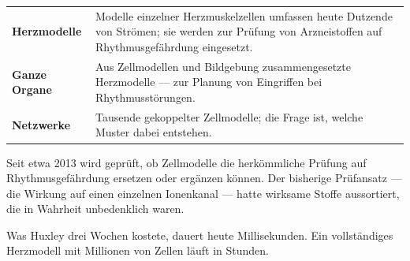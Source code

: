 \begin{forschung}
\begin{center}
{\small
\renewcommand{\arraystretch}{1.45}
\begin{tabular}{@{}P{2.8cm}P{5.4cm}@{}}
\toprule
\textbf{Herzmodelle} & Modelle einzelner Herzmuskelzellen umfassen heute Dutzende von Strömen; sie werden zur Prüfung von Arzneistoffen auf Rhythmusgefährdung eingesetzt.\\
\textbf{Ganze Organe} & Aus Zellmodellen und Bildgebung zusammengesetzte Herzmodelle --- zur Planung von Eingriffen bei Rhythmusstörungen.\\
\textbf{Netzwerke} & Tausende gekoppelter Zellmodelle; die Frage ist, welche Muster dabei entstehen.\\
\bottomrule
\end{tabular}}
\end{center}

Seit etwa 2013 wird geprüft, ob Zellmodelle die herkömmliche Prüfung auf Rhythmusgefährdung ersetzen oder ergänzen können. Der bisherige Prüfansatz --- die Wirkung auf einen einzelnen Ionenkanal --- hatte wirksame Stoffe aussortiert, die in Wahrheit unbedenklich waren.

\begin{center}
\begin{minipage}{0.88\textwidth}
\end{minipage}
\end{center}

Was Huxley drei Wochen kostete, dauert heute Millisekunden. Ein vollständiges Herzmodell mit Millionen von Zellen läuft in Stunden.

\begin{center}
\begin{minipage}{0.88\textwidth}
\end{minipage}
\end{center}
\end{forschung}

